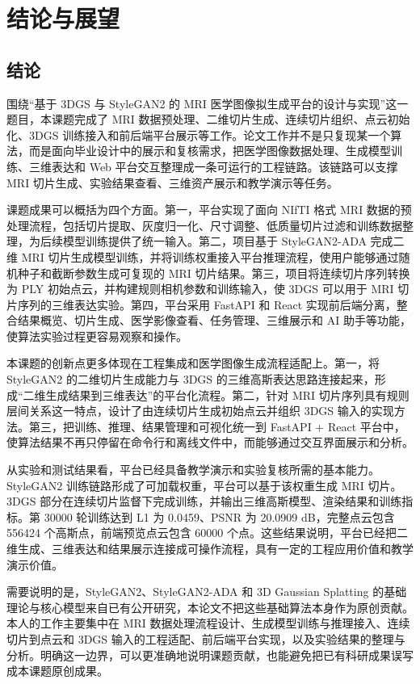 \chapter{结论与展望}

\section{结论}
围绕“基于 3DGS 与 StyleGAN2 的 MRI 医学图像拟生成平台的设计与实现”这一题目，本课题完成了 MRI 数据预处理、二维切片生成、连续切片组织、点云初始化、3DGS 训练接入和前后端平台展示等工作。论文工作并不是只复现某一个算法，而是面向毕业设计中的展示和复核需求，把医学图像数据处理、生成模型训练、三维表达和 Web 平台交互整理成一条可运行的工程链路。该链路可以支撑 MRI 切片生成、实验结果查看、三维资产展示和教学演示等任务。

课题成果可以概括为四个方面。第一，平台实现了面向 NIfTI 格式 MRI 数据的预处理流程，包括切片提取、灰度归一化、尺寸调整、低质量切片过滤和训练数据整理，为后续模型训练提供了统一输入。第二，项目基于 StyleGAN2-ADA 完成二维 MRI 切片生成模型训练，并将训练权重接入平台推理流程，使用户能够通过随机种子和截断参数生成可复现的 MRI 切片结果。第三，项目将连续切片序列转换为 PLY 初始点云，并构建规则相机参数和训练输入，使 3DGS 可以用于 MRI 切片序列的三维表达实验。第四，平台采用 FastAPI 和 React 实现前后端分离，整合结果概览、切片生成、医学影像查看、任务管理、三维展示和 AI 助手等功能，使算法实验过程更容易观察和操作。

本课题的创新点更多体现在工程集成和医学图像生成流程适配上。第一，将 StyleGAN2 的二维切片生成能力与 3DGS 的三维高斯表达思路连接起来，形成“二维生成结果到三维表达”的平台化流程。第二，针对 MRI 切片序列具有规则层间关系这一特点，设计了由连续切片生成初始点云并组织 3DGS 输入的实现方法。第三，把训练、推理、结果管理和可视化统一到 FastAPI + React 平台中，使算法结果不再只停留在命令行和离线文件中，而能够通过交互界面展示和分析。

从实验和测试结果看，平台已经具备教学演示和实验复核所需的基本能力。StyleGAN2 训练链路形成了可加载权重，平台可以基于该权重生成 MRI 切片。3DGS 部分在连续切片监督下完成训练，并输出三维高斯模型、渲染结果和训练指标。第 30000 轮训练达到 L1 为 0.0459、PSNR 为 20.0909 dB，完整点云包含 556424 个高斯点，前端预览点云包含 60000 个点。这些结果说明，平台已经把二维生成、三维表达和结果展示连接成可操作流程，具有一定的工程应用价值和教学演示价值。

需要说明的是，StyleGAN2、StyleGAN2-ADA 和 3D Gaussian Splatting 的基础理论与核心模型来自已有公开研究，本论文不把这些基础算法本身作为原创贡献。本人的工作主要集中在 MRI 数据处理流程设计、生成模型训练与推理接入、连续切片到点云和 3DGS 输入的工程适配、前后端平台实现，以及实验结果的整理与分析。明确这一边界，可以更准确地说明课题贡献，也能避免把已有科研成果误写成本课题原创成果。

